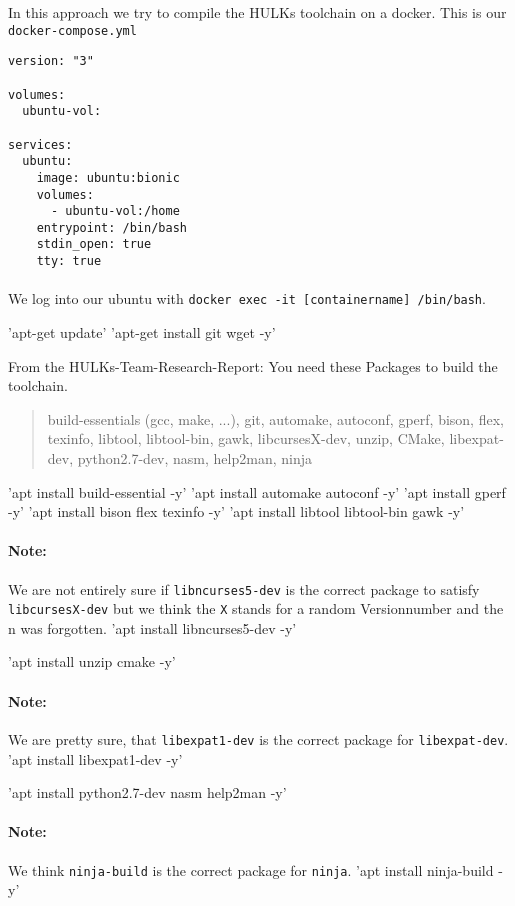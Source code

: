 \documentclass{article}
\begin{document}
In this approach we try to compile the HULKs toolchain on a docker.
This is our \texttt{docker-compose.yml}

\begin{verbatim}
version: "3"

volumes:
  ubuntu-vol:

services:
  ubuntu:
    image: ubuntu:bionic
    volumes:
      - ubuntu-vol:/home
    entrypoint: /bin/bash
    stdin_open: true
    tty: true
\end{verbatim}
\paragraph{}
We log into our ubuntu with
\texttt{docker exec -it [containername] /bin/bash}.

\bash'apt-get update'
\bash'apt-get install git wget -y'

From the HULKs-Team-Research-Report: You need these Packages to 
build the toolchain.
\begin{quote}
build-essentials (gcc, make, ...), git, automake, autoconf, gperf, bison, flex, texinfo,
libtool, libtool-bin, gawk, libcursesX-dev, unzip, CMake, libexpat-dev, python2.7-dev,
nasm, help2man, ninja
\end{quote}

\bash'apt install build-essential -y'
\bash'apt install automake autoconf -y'
\bash'apt install gperf -y'
\bash'apt install bison flex texinfo -y'
\bash'apt install libtool libtool-bin gawk -y'

\paragraph{Note:}
We are not entirely sure if \texttt{libncurses5-dev} is the correct package
to satisfy \texttt{libcursesX-dev} but we think the \texttt{X} stands for
a random Versionnumber and the n was forgotten.
\bash'apt install libncurses5-dev -y'

\bash'apt install unzip cmake -y'
\paragraph{Note:} We are pretty sure, that \texttt{libexpat1-dev} is the correct
package for \texttt{libexpat-dev}.
\bash'apt install libexpat1-dev -y'

\bash'apt install python2.7-dev nasm help2man -y'

\paragraph{Note:} We think \texttt{ninja-build} is the correct package for \texttt{ninja}.
\bash'apt install ninja-build -y'
\end{document}
